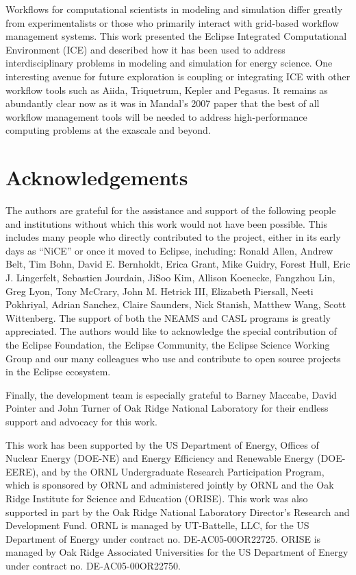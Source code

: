 Workflows for computational scientists in modeling and simulation differ
greatly from experimentalists or those who primarily interact with
grid-based workflow management systems. This work presented the Eclipse
Integrated Computational Environment (ICE) and described how it has
been used to address interdisciplinary problems in modeling and
simulation for energy science. One interesting avenue for future
exploration is coupling or integrating ICE with other workflow tools
such as Aiida, Triquetrum, Kepler and Pegasus. It remains as abundantly
clear now as it was in Mandal's 2007 paper that the best of all workflow
management tools will be needed to address high-performance computing
problems at the exascale and beyond.

\section*{Acknowledgements}\label{acknowledgements}

The authors are grateful for the assistance and support of the following
people and institutions without which this work would not have been
possible. This includes many people who directly contributed to the
project, either in its early days as ``NiCE'' or once it moved to
Eclipse, including: Ronald Allen, Andrew Belt, Tim Bohn, David E.
Bernholdt, Erica Grant, Mike Guidry, Forest Hull, Eric J. Lingerfelt,
Sebastien Jourdain, JiSoo Kim, Allison Koenecke, Fangzhou Lin, Greg
Lyon, Tony McCrary, John M. Hetrick III, Elizabeth Piersall, Neeti
Pokhriyal, Adrian Sanchez, Claire Saunders, Nick Stanish, Matthew Wang,
Scott Wittenberg. The support of both the NEAMS and CASL programs is
greatly appreciated. The authors would like to acknowledge the special
contribution of the Eclipse Foundation, the Eclipse Community, the
Eclipse Science Working Group and our many colleagues who use and
contribute to open source projects in the Eclipse ecosystem.

Finally, the development team is especially grateful to Barney Maccabe,
David Pointer and John Turner of Oak Ridge National Laboratory for their
endless support and advocacy for this work.

This work has been supported by the US Department of Energy, Offices of
Nuclear Energy (DOE-NE) and Energy Efficiency and Renewable Energy
(DOE-EERE), and by the ORNL Undergraduate Research Participation
Program, which is sponsored by ORNL and administered jointly by ORNL and
the Oak Ridge Institute for Science and Education (ORISE). This work was
also supported in part by the Oak Ridge National Laboratory Director's
Research and Development Fund. ORNL is managed by UT-Battelle, LLC, for
the US Department of Energy under contract no. DE-AC05-00OR22725. ORISE
is managed by Oak Ridge Associated Universities for the US Department of
Energy under contract no. DE-AC05-00OR22750.

